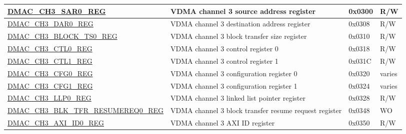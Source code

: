 \begin{longtable}{ | L{7.8cm} | L{6cm} | l | l | }
\hyperref[regdesc:DMACCHNSAR0REG]{DMAC\_CH3\_SAR0\_REG} & VDMA channel 3 source address register & 0x0300 & R/W \\ \hline
\hyperref[regdesc:DMACCHNDAR0REG]{DMAC\_CH3\_DAR0\_REG} & VDMA channel 3 destination address register & 0x0308 & R/W \\ \hline
\hyperref[regdesc:DMACCHNBLOCKTS0REG]{DMAC\_CH3\_BLOCK\_TS0\_REG} & VDMA channel 3 block transfer size register & 0x0310 & R/W \\ \hline
\hyperref[regdesc:DMACCHNCTL0REG]{DMAC\_CH3\_CTL0\_REG} & VDMA channel 3 control register 0 & 0x0318 & R/W \\ \hline
\hyperref[regdesc:DMACCHNCTL1REG]{DMAC\_CH3\_CTL1\_REG} & VDMA channel 3 control register 1 & 0x031C & R/W \\ \hline
\hyperref[regdesc:DMACCHNCFG0REG]{DMAC\_CH3\_CFG0\_REG} & VDMA channel 3 configuration register 0 & 0x0320 & varies \\ \hline
\hyperref[regdesc:DMACCHNCFG1REG]{DMAC\_CH3\_CFG1\_REG} & VDMA channel 3 configuration register 1 & 0x0324 & varies \\ \hline
\hyperref[regdesc:DMACCHNLLP0REG]{DMAC\_CH3\_LLP0\_REG} & VDMA channel 3 linked list pointer register & 0x0328 & R/W \\ \hline
\hyperref[regdesc:DMACCHNBLKTFRRESUMEREQ0REG]{DMAC\_CH3\_BLK\_TFR\_RESUMEREQ0\_REG} & VDMA channel 3 block transfer resume request register & 0x0348 & WO \\ \hline
\hyperref[regdesc:DMACCHNAXIID0REG]{DMAC\_CH3\_AXI\_ID0\_REG} & VDMA channel 3 AXI ID register & 0x0350 & R/W \\ \hline


\end{longtable}
